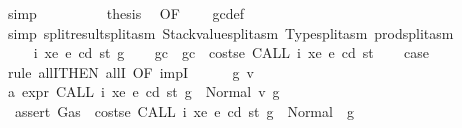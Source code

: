 \begin{isabellebody}
\ simp\isanewline
\ \ \ \ \ \ \isamarkupfalse%
\ \isamarkupfalse%
\ {\isacharquery}{\kern0pt}thesis\ \isamarkupfalse%
\ {}{}{\isacharparenleft}{\kern0pt}{}{\isacharparenright}{\kern0pt}{\isacharbrackleft}{\kern0pt}OF\ {\isacharasterisk}{\kern0pt}\ {\isacharasterisk}{\kern0pt}{\isacharasterisk}{\kern0pt}{\isacharbrackright}{\kern0pt}\ \isamarkupfalse%
\ gc{\isacharunderscore}{\kern0pt}def\ \isamarkupfalse%
\ {\isacharparenleft}{\kern0pt}simp\ split{\isacharcolon}{\kern0pt}result{\isachardot}{\kern0pt}split{\isacharunderscore}{\kern0pt}asm\ Stackvalue{\isachardot}{\kern0pt}split{\isacharunderscore}{\kern0pt}asm\ Type{\isachardot}{\kern0pt}split{\isacharunderscore}{\kern0pt}asm\ prod{\isachardot}{\kern0pt}split{\isacharunderscore}{\kern0pt}asm{\isacharparenright}{\kern0pt}\isanewline
\ \ \ \ \isamarkupfalse%
\isanewline
\ \ \isamarkupfalse%
\isanewline
{}\isamarkupfalse%
\isanewline
\ \ \isamarkupfalse%
\ {\isacharparenleft}{\kern0pt}{}{}\ i\ xe\ e\ cd\ st\ g{\isacharparenright}{\kern0pt}\isanewline
\ \ \isamarkupfalse%
\ gc\ \ {\isachardoublequoteopen}gc\ {\isacharequal}{\kern0pt}\ costs\isactrlsub e\ {\isacharparenleft}{\kern0pt}CALL\ i\ xe{\isacharparenright}{\kern0pt}\ e\ cd\ st{\isachardoublequoteclose}\isanewline
\ \ \isamarkupfalse%
\ {\isacharquery}{\kern0pt}case\isanewline
\ \ \isamarkupfalse%
\ {\isacharparenleft}{\kern0pt}rule\ allI{\isacharbrackleft}{\kern0pt}THEN\ allI{\isacharcomma}{\kern0pt}\ OF\ impI{\isacharbrackright}{\kern0pt}{\isacharparenright}{\kern0pt}\isanewline
\ \ \ \ \isamarkupfalse%
\ g{}{\isacharprime}{\kern0pt}\ v{}\ \isamarkupfalse%
\ a{}{\isacharcolon}{\kern0pt}\ {\isachardoublequoteopen}expr\ {\isacharparenleft}{\kern0pt}CALL\ i\ xe{\isacharparenright}{\kern0pt}\ e\ cd\ st\ g\ {\isacharequal}{\kern0pt}\ Normal\ {\isacharparenleft}{\kern0pt}v{}{\isacharcomma}{\kern0pt}\ g{}{\isacharprime}{\kern0pt}{\isacharparenright}{\kern0pt}{\isachardoublequoteclose}\isanewline
\ \ \ \ \isamarkupfalse%
\ \isamarkupfalse%
\ {\isacharasterisk}{\kern0pt}{\isacharcolon}{\kern0pt}\ {\isachardoublequoteopen}assert\ Gas\ {\isacharparenleft}{\kern0pt}{\isacharparenleft}{\kern0pt}{\isacharless}{\kern0pt}{\isacharparenright}{\kern0pt}\ {\isacharparenleft}{\kern0pt}costs\isactrlsub e\ {\isacharparenleft}{\kern0pt}CALL\ i\ xe{\isacharparenright}{\kern0pt}\ e\ cd\ st{\isacharparenright}{\kern0pt}{\isacharparenright}{\kern0pt}\ g\ {\isacharequal}{\kern0pt}\ Normal\ {\isacharparenleft}{\kern0pt}{\isacharparenleft}{\kern0pt}{\isacharparenright}{\kern0pt}{\isacharcomma}{\kern0pt}\ g{\isacharparenright}{\kern0pt}{\isachardoublequoteclose}\ \isamarkupfalse%

\end{isabellebody}
